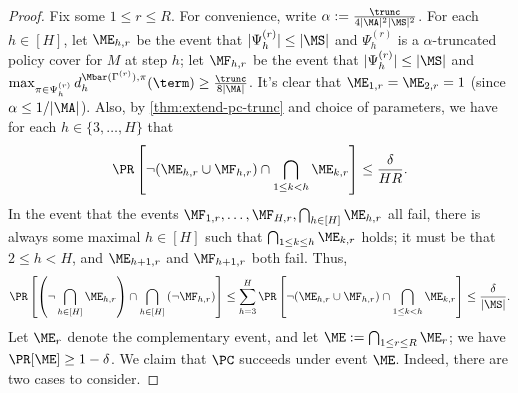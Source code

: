 \iffalse
\begin{proof}
Fix some $1 \leq r \leq R$. For convenience, write $\alpha := \frac{\trunc}{4|\MA|^2|\MS|^2}$. For each $h \in [H]$, let $\ME_{h,r}$ be the event that $|\Psi_h^{(r)}| \leq |\MS|$ and $\Psi_h^{(r)}$ is a $\alpha$-truncated policy cover for $M$ at step $h$; let $\MF_{h,r}$ be the event that $|\Psi_{h}^{(r)}| \leq |\MS|$ and $\max_{\pi\in\Psi_{h}^{(r)}} d^{\Mbar(\Gamma^{(r)}),\pi}_{h}(\term) \geq \frac{\trunc}{8|\MA|}$. It's clear that $\ME_{1,r} = \ME_{2,r} = 1$ (since $\alpha \leq 1/|\MA|$). Also, by \cref{thm:extend-pc-trunc} and choice of parameters, we have for each $h \in \{3,\dots,H\}$ that
\[\Pr\left[\lnot (\ME_{h,r} \cup \MF_{h,r}) \cap \bigcap_{1 \leq k < h} \ME_{k,r}\right] \leq \frac{\delta}{HR}.\]
In the event that the events $\MF_{1,r},\dots,\MF_{H,r}, \bigcap_{h\in[H]} \ME_{h,r}$ all fail, there is always some maximal $h \in [H]$ such that $\bigcap_{1 \leq k \leq h} \ME_{k,r}$ holds; it must be that $2 \leq h<H$, and $\ME_{h+1,r}$ and $\MF_{h+1,r}$ both fail. Thus,
\[\Pr\left[\left(\lnot \bigcap_{h \in [H]} \ME_{h,r}\right) \cap \bigcap_{h \in [H]} \left(\lnot \MF_{h,r}\right)\right] \leq \sum_{h=3}^H \Pr\left[\lnot (\ME_{h,r} \cup \MF_{h,r}) \cap \bigcap_{1 \leq k < h} \ME_{k,r}\right] \leq \frac{\delta}{|\MS|}.\]
Let $\ME_r$ denote the complementary event, and let $\ME := \bigcap_{1 \leq r \leq R} \ME_r$; we have $\Pr[\ME] \geq 1-\delta$. We claim that $\PC$ succeeds under event $\ME$. Indeed, there are two cases to consider.


\end{proof}
